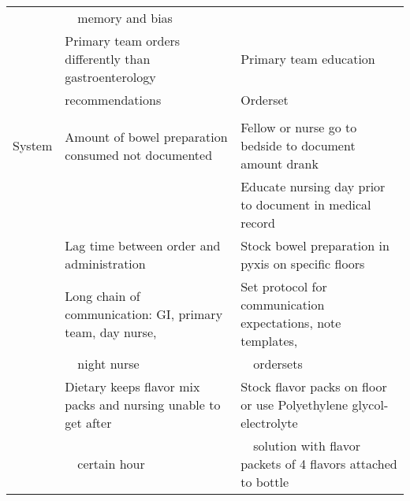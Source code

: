 \begin{flushleft}
\begin{table}
\begin{tiny}
\begin{tabular}{lll}
     & \ \ memory and bias & \\
     & Primary team orders differently than gastroenterology & Primary team education \\
     & recommendations & Orderset \\
     & & \\
    System & Amount of bowel preparation consumed not documented & Fellow or nurse go to bedside to document amount drank\\
     & & Educate nursing day prior to document in medical record\\
     & Lag time between order and administration & Stock bowel preparation in pyxis on specific floors\\
     & Long chain of communication: GI, primary team, day nurse, & Set protocol for communication expectations, note templates, \\
     & \ \ night nurse & \ \ ordersets \\
     & Dietary keeps flavor mix packs and nursing unable to get after & Stock flavor packs on floor or use Polyethylene glycol-electrolyte \\
     & \ \ certain hour & \ \ solution with flavor packets of 4 flavors attached to bottle \\ \hline
    \end{tabular}
    \end{tiny}
 \end{table}
 \end{flushleft}
% 